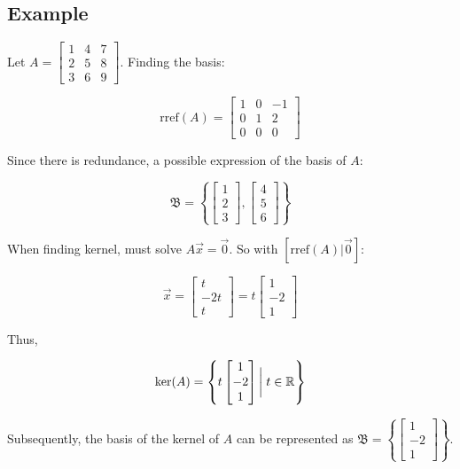 \subsection{Example}

Let $A=\begin{bmatrix}1&4&7\\ 2&5&8\\3&6&9\end{bmatrix}$. Finding the basis:

\[
    \mathrm{rref}(A)=
     \begin{bmatrix}1&0&-1\\ 0&1&2\\0&0&0\end{bmatrix}
\] 

Since there is redundance, a possible expression of the basis of $A$:

\[\mathfrak{B}=\left\{\begin{bmatrix}1\\2\\3\end{bmatrix},\begin{bmatrix}4\\5\\6\end{bmatrix}\right\}\]

When finding kernel, must solve $A\vec{x}=\vec{0}$. So with $[\mathrm{rref}(A)|\vec{0}]$:

\[\vec{x}=\begin{bmatrix}t\\ -2t\\t\end{bmatrix}=t \begin{bmatrix}1\\-2\\1\end{bmatrix}\]

Thus,

\[\mathrm{ker}(A)=\left\{t\begin{bmatrix}1\\-2\\1\end{bmatrix}\bigg|\;t\in \mathbb{R}\right\}\]

\noindent
Subsequently, the basis of the kernel of $A$ can be represented as $\mathfrak{B}=\left\{\begin{bmatrix}1\\-2\\1\end{bmatrix}\right\}$.

